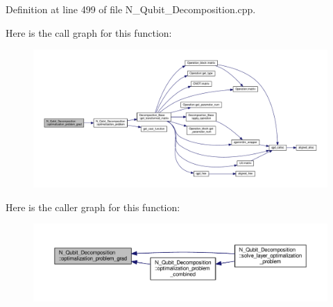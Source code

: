 Definition at line 499 of file N\+\_\+\+Qubit\+\_\+\+Decomposition.\+cpp.



Here is the call graph for this function\+:
\nopagebreak
\begin{figure}[H]
\begin{center}
\leavevmode
\includegraphics[width=350pt]{class_n___qubit___decomposition_ab03a0f4e7cecacc48fc73999fd9ff16c_cgraph}
\end{center}
\end{figure}




Here is the caller graph for this function\+:
\nopagebreak
\begin{figure}[H]
\begin{center}
\leavevmode
\includegraphics[width=350pt]{class_n___qubit___decomposition_ab03a0f4e7cecacc48fc73999fd9ff16c_icgraph}
\end{center}
\end{figure}


